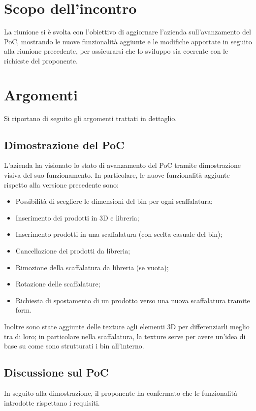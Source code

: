 \section{Scopo dell'incontro} \label{sec:scopo}
La riunione si è svolta con l'obiettivo di aggiornare l'azienda \nomeAzienda \space sull'avanzamento del PoC, mostrando le nuove funzionalità aggiunte e le modifiche apportate in seguito alla riunione precedente, per assicurarsi che lo sviluppo sia coerente con le richieste del proponente. 

\section{Argomenti} \label{sec:argomenti}
\noindent Si riportano di seguito gli argomenti trattati in dettaglio.

\subsection{Dimostrazione del PoC}
L'azienda ha visionato lo stato di avanzamento del PoC tramite dimostrazione visiva del suo funzionamento. In particolare, le nuove funzionalità aggiunte rispetto alla versione precedente sono:
\begin{itemize}
    \item Possibilità di scegliere le dimensioni del bin per ogni scaffalatura;
    \item Inserimento dei prodotti in 3D e libreria;
    \item Inserimento prodotti in una scaffalatura (con scelta casuale del bin);
    \item Cancellazione dei prodotti da libreria;
    \item Rimozione della scaffalatura da libreria (se vuota);
    \item Rotazione delle scaffalature;
    \item Richiesta di spostamento di un prodotto verso una nuova scaffalatura tramite form.    
\end{itemize}
\noindent Inoltre sono state aggiunte delle texture agli elementi 3D per differenziarli meglio tra di loro; in particolare nella scaffalatura, la texture serve per avere un'idea di base su come sono strutturati i bin all'interno.

\subsection{Discussione sul PoC}
In seguito alla dimostrazione, il proponente ha confermato che le funzionalità introdotte rispettano i requisiti.
